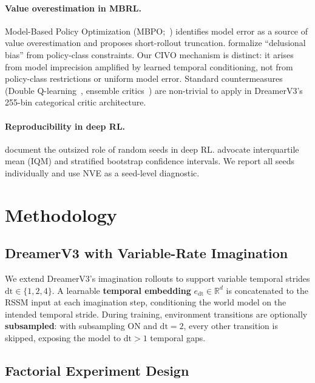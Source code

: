 \documentclass[10pt,letterpaper]{article}
\begin{document}
\paragraph{Value overestimation in MBRL.}
Model-Based Policy Optimization (MBPO;~\citealt{janner2019mbpo}) identifies model error as a source of value overestimation and proposes short-rollout truncation.
\citet{lu2018delusional} formalize ``delusional bias'' from policy-class constraints.
Our CIVO mechanism is distinct: it arises from model imprecision amplified by learned temporal conditioning, not from policy-class restrictions or uniform model error.
Standard countermeasures (Double Q-learning~\citep{hasselt2010doubleq,fujimoto2018td3}, ensemble critics~\citep{chen2021redq}) are non-trivial to apply in DreamerV3's 255-bin categorical critic architecture.

\paragraph{Reproducibility in deep RL.}
\citet{henderson2018matters} document the outsized role of random seeds in deep RL.
\citet{agarwal2021deep} advocate interquartile mean (IQM) and stratified bootstrap confidence intervals.
We report all seeds individually and use NVE as a seed-level diagnostic.

\section{Methodology}

\subsection{DreamerV3 with Variable-Rate Imagination}

We extend DreamerV3's imagination rollouts to support variable temporal strides $\mathrm{dt} \in \{1, 2, 4\}$.
A learnable \textbf{temporal embedding} $e_{\mathrm{dt}} \in \mathbb{R}^d$ is concatenated to the RSSM input at each imagination step, conditioning the world model on the intended temporal stride.
During training, environment transitions are optionally \textbf{subsampled}: with subsampling ON and $\mathrm{dt}=2$, every other transition is skipped, exposing the model to $\mathrm{dt}>1$ temporal gaps.

\subsection{Factorial Experiment Design}
\end{document}
